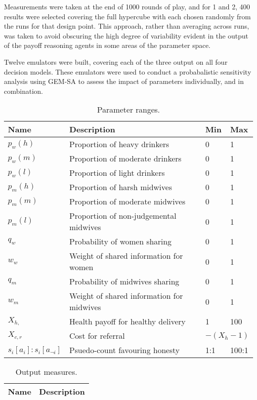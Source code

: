 Measurements were taken at the end of 1000 rounds of play, and for 1 and 2, 400 results were selected covering the full hypercube with each chosen randomly from the runs for that design point. This approach, rather than averaging across runs, was taken to avoid obscuring the high degree of variability evident in the output of the payoff reasoning agents in some areas of the parameter space.

Twelve emulators were built, covering each of the three output on all four decision models. These emulators were used to conduct a probabalistic sensitivity analysis using \ac{GEM-SA} to assess the impact of parameters individually, and in combination.

\begin{table}
\center
\begin{tabular} {|l | l | l| l|}
\hline
Name & Description & Min & Max \\ \hline
\(p_{w}(h)\) & Proportion of heavy drinkers & 0 & 1 \\ \hline
\(p_{w}(m)\) & Proportion of moderate drinkers & 0 & 1 \\ \hline
\(p_{w}(l)\) & Proportion of light drinkers & 0 & 1 \\ \hline
\(p_{m}(h)\) & Proportion of harsh midwives & 0 & 1 \\ \hline
\(p_{m}(m)\) & Proportion of moderate midwives & 0 & 1 \\ \hline
\(p_{m}(l)\) & Proportion of non-judgemental midwives & 0 & 1 \\ \hline
\(q_{w}\) & Probability of women sharing & 0 & 1 \\ \hline
\(w_{w}\) & Weight of shared information for women & 0 & 1 \\ \hline
\(q_{m}\) & Probability of midwives sharing & 0 & 1 \\ \hline
\(w_{m}\) & Weight of shared information for midwives & 0 & 1 \\ \hline
\(X_{h,}\) & Health payoff for healthy delivery & 1 & 100 \\ \hline
\(X_{c, r}\) & Cost for referral & \multicolumn{2}{l|}{\(-(X_{h} - 1)\)} \\ \hline
\(s_{i}[a_{i}]:s_{i}[a_{\neg i}]\) & Psuedo-count favouring honesty & 1:1 & 100:1 \\ \hline
\end{tabular}
\caption[Table caption text]{Parameter ranges. \label{tab:sa_params}}
\end{table}

\begin{table}
\center
\begin{tabular} {| l | l |}
Name & Description \\ \hline



\end{tabular}
\caption[Table caption text]{Output measures. \label{tab:sa_measures}}
\end{table}